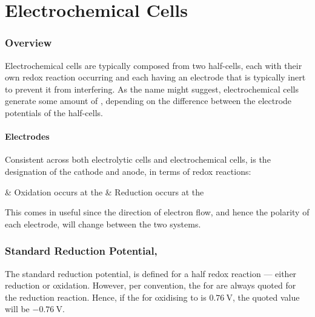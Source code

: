 

\pagebreak
\part{Electrochemical Cells}

	\section{Overview}

		Electrochemical cells are typically composed from two half-cells, each with their own redox reaction occurring and each having an
		electrode that is typically inert to prevent it from interfering. As the name might suggest, electrochemical cells generate some
		amount of \emf{}, depending on the difference between the electrode potentials of the half-cells.

		\subsection{Electrodes}

			Consistent across both electrolytic cells and electrochemical cells, is the designation of the cathode and anode, in terms of
			redox reactions:

			\begin{bulletlist}
				& Oxidation occurs at the 
				& Reduction occurs at the 
			\end{bulletlist}

			This comes in useful since the direction of electron flow, and hence the polarity of each electrode, will change between the two
			systems.


	\section{Standard Reduction Potential, \texorpdfstring{\Eo{}}{E°}}

		The standard reduction potential, \Eo{} is defined for a half redox reaction --- either reduction or oxidation. However, per
		convention, the  for \Eo{} are always quoted for the reduction reaction. Hence, if the \Eo{} for oxidising
		 to  is $\SI{+0.76}{\volt}$, the quoted \Eo{} value will be $\SI{-0.76}{\volt}$.

